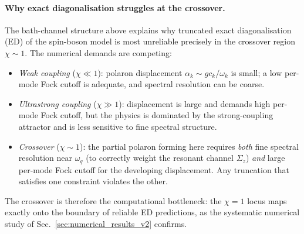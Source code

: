 \paragraph{Why exact diagonalisation struggles at the crossover.}
The bath-channel structure above explains why truncated exact diagonalisation
(ED) of the spin-boson model is most unreliable precisely in the crossover
region $\chi\sim 1$.  The numerical demands are competing:

\begin{itemize}
  \item \emph{Weak coupling} ($\chi\ll 1$): polaron displacement
  $\alpha_k\sim gc_k/\omega_k$ is small; a low per-mode Fock cutoff is
  adequate, and spectral resolution can be coarse.
  \item \emph{Ultrastrong coupling} ($\chi\gg 1$): displacement is large and
  demands high per-mode Fock cutoff, but the physics is dominated by the
  strong-coupling attractor and is less sensitive to fine spectral structure.
  \item \emph{Crossover} ($\chi\sim 1$): the partial polaron forming here
  requires \emph{both} fine spectral resolution near $\omega_q$ (to correctly
  weight the resonant channel $\Sigma_z$) \emph{and} large per-mode Fock
  cutoff for the developing displacement.  Any truncation that satisfies one
  constraint violates the other.
\end{itemize}

The crossover is therefore the computational bottleneck: the $\chi=1$ locus
maps exactly onto the boundary of reliable ED predictions, as the systematic
numerical study of Sec.~\ref{sec:numerical_results_v2} confirms.
